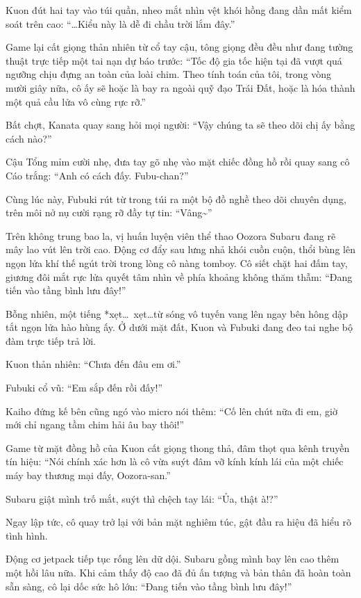\documentclass[../main.tex]{subfiles}
\begin{document}
Kuon đút hai tay vào túi quần, nheo mắt nhìn vệt khói hồng đang dần mất kiểm soát trên cao: ``\dots Kiểu này là dễ đi chầu trời lắm đây.''

Game lại cất giọng thản nhiên từ cổ tay cậu, tông giọng đều đều như đang tường thuật trực tiếp một tai nạn dự báo trước: ``Tốc độ gia tốc hiện tại đã vượt quá ngưỡng chịu đựng an toàn của loài chim. Theo tính toán của tôi, trong vòng mười giây nữa, cô ấy sẽ hoặc là bay ra ngoài quỹ đạo Trái Đất, hoặc là hóa thành một quả cầu lửa vô cùng rực rỡ.''

Bất chợt, Kanata quay sang hỏi mọi người: ``Vậy chúng ta sẽ theo dõi chị ấy bằng cách nào?''

Cậu Tổng mỉm cười nhẹ, đưa tay gõ nhẹ vào mặt chiếc đồng hồ rồi quay sang cô Cáo trắng: ``Anh có cách đấy. Fubu-chan?''

Cùng lúc này, Fubuki rút từ trong túi ra một bộ đồ nghề theo dõi chuyên dụng, trên môi nở nụ cười rạng rỡ đầy tự tin: ``Vâng\~{}''

\ct

Trên không trung bao la, vị huấn luyện viên thể thao Oozora Subaru đang rẽ mây lao vút lên trời cao. Động cơ đẩy sau lưng nhả khói cuồn cuộn, thổi bùng lên ngọn lửa khí thế ngút trời trong lòng cô nàng tomboy. Cô siết chặt hai đấm tay, giương đôi mắt rực lửa quyết tâm nhìn về phía khoảng không thăm thẫm: ``Đang tiến vào tầng bình lưu đây!''

Bỗng nhiên, một tiếng *xẹt\dots\ xẹt\dots* từ sóng vô tuyến vang lên ngay bên hông dập tắt ngọn lửa hào hùng ấy. Ở dưới mặt đất, Kuon và Fubuki đang đeo tai nghe bộ đàm trực tiếp trả lời.

Kuon thản nhiên: ``Chưa đến đâu em ơi.''

Fubuki cổ vũ: ``Em sắp đến rồi đấy!''

Kaiho đứng kế bên cũng ngó vào micro nói thêm: ``Cố lên chút nữa đi em, giờ mới chỉ ngang tầm chim hải âu bay thôi!''

Game từ mặt đồng hồ của Kuon cất giọng thong thả, đâm thọt qua kênh truyền tín hiệu: ``Nói chính xác hơn là cô vừa suýt đâm vỡ kính kính lái của một chiếc máy bay thương mại đấy, Oozora-san.''

Subaru giật mình trố mắt, suýt thì chệch tay lái: ``Ủa, thật à!?''

Ngay lập tức, cô quay trở lại với bản mặt nghiêm túc, gật đầu ra hiệu đã hiểu rõ tình hình.

Động cơ jetpack tiếp tục rống lên dữ dội. Subaru gồng mình bay lên cao thêm một hồi lâu nữa. Khi cảm thấy độ cao đã đủ ấn tượng và bản thân đã hoàn toàn sẵn sàng, cô lại dốc sức hô lớn: ``Đang tiến vào tầng bình lưu đây!''
\end{document}
